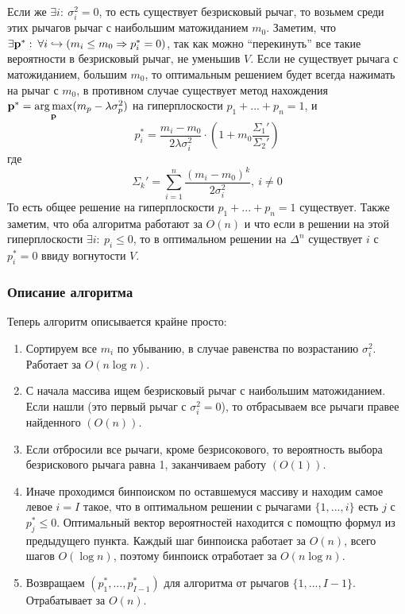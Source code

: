 Если же $\exists i: \: \sigma_i^2 = 0$, то есть существует безрисковый рычаг, то возьмем среди этих рычагов рычаг с наибольшим матожиданием $m_0$. Заметим, что $\exists \textbf{p}^*: \: \forall i \hookrightarrow (m_i \leq m_0 \Rightarrow p_i^* = 0)$, так как можно ``перекинуть'' все такие вероятности в безрисковый рычаг, не уменьшив $V$. Если не существует рычага с матожиданием, большим $m_0$, то оптимальным решением будет всегда нажимать на рычаг с $m_0$, в противном случае существует метод нахождения $\textbf{p}^* = \underset{\textbf{p}}{\arg \max} (m_p - \lambda \sigma_p^2)$ на гиперплоскости $p_1 + ... + p_n = 1$, и 
\[p_i^* = \frac{m_i - m_0}{2 \lambda \sigma_i^2} \cdot \left(1 + m_0 \frac{\Sigma_1'}{\Sigma_2'} \right)\]
где
\[
\Sigma_k' = \sum_{i=1}^n \frac{(m_i - m_0)^k}{2 \sigma_i^2}, \: i \neq 0
\] 
То есть общее решение на гиперплоскости $p_1 + ... + p_n = 1$ существует. Также заметим, что оба алгоритма работают за $O(n)$ и что если в решении на этой гиперплоскости $\exists i: \: p_i \leq 0$, то в оптимальном решении на $\Delta^n$ существует $i$ с $p_i^* = 0$ ввиду вогнутости $V$.

\subsubsection{Описание алгоритма}

Теперь алгоритм описывается крайне просто:
\begin{enumerate}
    \item Сортируем все $m_i$ по убыванию, в случае равенства по возрастанию $\sigma_i^2$. Работает за $O(n \log n)$.
    \item С начала массива ищем безрисковый рычаг с наибольшим матожиданием. Если нашли (это первый рычаг с $\sigma_i^2 = 0$), то отбрасываем все рычаги правее найденного $\left(O(n) \right)$. 
    \item Если отбросили все рычаги, кроме безрисокового, то вероятность выбора безрискового рычага равна 1, заканчиваем работу $\left( O(1) \right)$.
    \item Иначе проходимся бинпоиском по оставшемуся массиву и находим самое левое $i=I$ такое, что в оптимальном решении с рычагами $\{1, ..., i\}$ есть $j$ с $p_j^* \leq 0$. Оптимальный вектор вероятностей находится с помощтю формул из предыдущего пункта. Каждый шаг бинпоиска работает за $O(n)$, всего шагов $O(\log n)$, поэтому бинпоиск отработает за $O(n \log n)$.
    \item Возвращаем $(p_1^*, ..., p_{I-1}^*)$ для алгоритма от рычагов $\{1, ..., I-1\}$. Отрабатывает за $O(n)$.
\end{enumerate}

